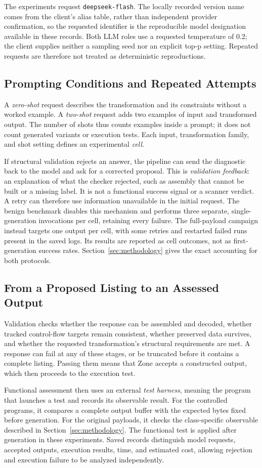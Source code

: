 The experiments request \texttt{deepseek-flash}. The locally recorded
version name comes from the client's alias table, rather than independent
provider confirmation, so the requested identifier is the reproducible
model designation available in these records. Both LLM roles use a
requested temperature of 0.2; the client supplies neither a sampling seed
nor an explicit top-p setting. Repeated requests are therefore not treated
as deterministic reproductions.

\subsection{Prompting Conditions and Repeated Attempts}
A \emph{zero-shot} request describes the transformation and its constraints
without a worked example. A \emph{two-shot} request adds two examples of
input and transformed output. The number of shots thus counts examples
inside a prompt; it does not count generated variants or execution tests.
Each input, transformation family, and shot setting defines an experimental
\emph{cell}.

If structural validation rejects an answer, the pipeline can send the
diagnostic back to the model and ask for a corrected proposal. This is
\emph{validation feedback}: an explanation of what the checker rejected,
such as assembly that cannot be built or a missing label. It is not a
functional success signal or a scanner verdict. A retry can therefore use
information unavailable in the initial request.
The benign benchmark disables
this mechanism and performs three separate, single-generation invocations
per cell, retaining every failure. The full-payload campaign instead
targets one output per cell, with some retries and restarted failed runs
present in the saved logs. Its results are reported as cell outcomes, not
as first-generation success rates. Section~\ref{sec:methodology} gives the
exact accounting for both protocols.

\subsection{From a Proposed Listing to an Assessed Output}
Validation checks whether the response can be assembled and decoded,
whether tracked control-flow targets remain consistent, whether preserved
data survives, and whether the requested transformation's structural
requirements are met. A response can fail at any of these stages, or be
truncated before it contains a complete listing. Passing them means that
Zone accepts a constructed output, which then proceeds to the execution test.

Functional assessment then uses an external \emph{test harness}, meaning
the program that launches a test and records its observable result. For
the controlled programs, it compares a complete output buffer with the expected
bytes fixed before generation. For the original payloads, it checks the
class-specific observable described in Section~\ref{sec:methodology}.
The functional test is applied after generation in these experiments. Saved records distinguish model requests, accepted outputs,
execution results, time, and estimated cost, allowing rejection and execution
failure to be analyzed independently.

